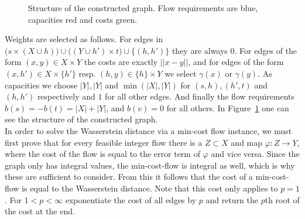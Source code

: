 \documentclass[11pt, a4paper, UKenglish]{article}
\begin{document}
\begin{figure}
\begin{tikzpicture}[scale = .95]
        \end{tikzpicture}
        \caption{Structure of the constructed graph.
        Flow requirements are blue, capacities red and costs green.}
        \label{graph}
    \end{figure}

    Weights are selected as follows.
    For edges in $\big({s}\times (X\cup h)\big) \cup \big((Y\cup h')\times t\big) \cup \{(h,h')\}$ they are always 0.
    For edges of the form $(x,y)\in X\times Y$ the costs are exactly $||x-y||$, and for edges of the form $(x,h')\in X\times \{h'\}$ resp. $(h,y)\in \{h\}\times Y$ we select $\gamma(x)$ or $\gamma(y)$.
    As capacities we choose $|Y|,|Y|$ and $\min(|X|,|Y|)$ for $(s,h),(h',t)$ and $(h,h')$ respectively and $1$ for all other edges.
    And finally the flow requirements $b(s) = -b(t) = |X|+|Y|$, and $b(v)=0$ for all others.
    In Figure\ \ref{graph} one can see the structure of the constructed graph.\\
    In order to solve the Wasserstein distance via a min-cost flow instance, we must first prove that for every feasible integer flow there is a $Z\subset X$ and map $\varphi:Z\rightarrow Y$, where the cost of the flow is equal to the error term of $\varphi$ and vice versa.
    Since the graph only has integral values, the min-cost-flow is integral as well, which is why these are sufficient to consider.
    From this it follows that the cost of a min-cost-flow is equal to the Wasserstein distance.
    Note that this cost only applies to $p=1$.
    For $1<p<\infty$ exponentiate the cost of all edges by $p$ and return the $p$th root of the cost at the end.
\end{document}
